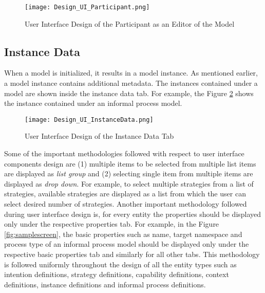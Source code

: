 \begin{figure} [H]
	\centering
	\texttt{[image: Design\_UI\_Participant.png]}
	\caption{User Interface Design of the Participant as an Editor of the Model}
	\label{fig:samplescreen_pl_editor}
\end{figure}

\subsection{Instance Data}
When a model is initialized, it results in a model instance. As mentioned earlier, a model instance contains additional metadata. The instances contained under a model are shown inside the instance data tab. For example, the Figure \ref{fig:samplescreen_instance} shows the instance contained under an informal process model. 
  

\begin{figure} [H]
	\centering
	\texttt{[image: Design\_UI\_InstanceData.png]}
	\caption{User Interface Design of the Instance Data Tab}
	\label{fig:samplescreen_instance}
\end{figure}


Some of the important methodologies followed with respect to user interface components design are (1) multiple items to be selected from multiple list items are displayed as \textit{list group} and (2) selecting single item from multiple items are displayed as \textit{drop down}. For example, to select multiple strategies from a list of strategies, available strategies are displayed as a list from which the user can select desired number of strategies. Another important methodology followed during user interface design is, for every entity the properties should be displayed only under the respective properties tab. For example, in the Figure \ref{fig:samplescreen}, the basic properties such as name, target namespace and process type of an informal process model should be displayed only under the respective basic properties tab and similarly for all other tabs. This methodology is followed uniformly throughout the design of all the entity types such as intention definitions, strategy definitions, capability definitions, context definitions, instance definitions and informal process definitions. 

